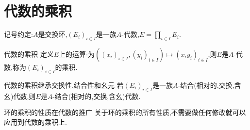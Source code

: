 \section{代数的乘积}

记号约定:$A$是交换环,$\left(E_{i}\right)_{i\in I}$是一族$A$-代数,$E=\prod\limits_{i\in I}E_{i}$.

\begin{definition}{代数的乘积}{}
	定义$E$上的运算$\cdot$为$\left(\left(x_{i}\right)_{i\in I},\left(y_{i}\right)_{i\in I}\right)\mapsto\left(x_{i}y_{i}\right)_{i\in I}$,则$E$是$A$-代数,称为$\left(E_{i}\right)_{i\in I}$的乘积.
\end{definition}

\begin{proposition}{代数的乘积继承交换性,结合性和幺元}{}
	若$\left(E_{i}\right)_{i\in I}$是一族$A$-结合(相对的,交换,含幺)代数,则$E$是$A$-结合(相对的,交换,含幺)代数.
\end{proposition}

\begin{remark}{环的乘积的性质在代数的推广}{}
	关于环的乘积的所有性质,不需要做任何修改就可以应用到代数的乘积上.
\end{remark}